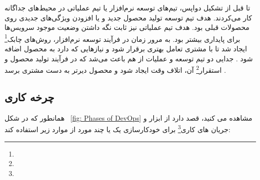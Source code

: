 تا قبل از تشکیل دواپس، تیم‌های توسعه نرم‌افزار یا تیم عملیاتی در محیط‌های جداگانه کار می‌کردند. هدف تیم توسعه تولید محصول جدید و یا افزودن ویژگی‌های جدیدی روی محصولات قبلی بود. هدف تیم عملیاتی نیز ثابت نگه داشتن وضعیت موجود سرویس‌ها برای پایداری بیشتر بود. به مرور زمان در فرآیند توسعه نرم‌افزار، روش‌های چابک\footnote{}
ایجاد شد تا با مشتری تعامل بهتری برقرار شود و نیازهایی که دارد به محصول اضافه شود \cite{DevopsAgile}. جدایی دو تیم توسعه و عملیات از هم باعث می‌شد که در فرآیند تولید محصول و استقرار\footnote{} آن، اتلاف وقت ایجاد شود و محصول دیرتر به دست مشتری برسد \cite{DevopsCD}.

\subsection{چرخه کاری}
همانطور که در شکل 
~\ref{fig: Phases of DevOps}
مشاهده می کنید،
قصد دارد از ابزار و جریان های کاری\footnote{} برای خودکارسازی یک یا چند مورد از موارد زیر استفاده کند: 
